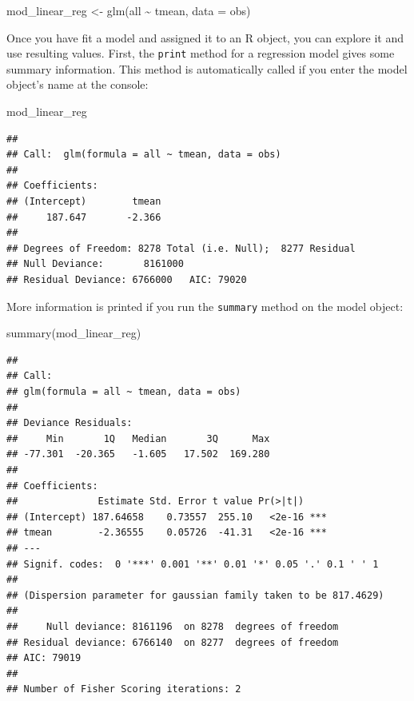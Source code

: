 \documentclass[
]{book}
\newenvironment{Shaded}{\begin{snugshade}}{\end{snugshade}}
\newcommand{\AttributeTok}[1]{\textcolor[rgb]{0.77,0.63,0.00}{#1}}
\newcommand{\FunctionTok}[1]{\textcolor[rgb]{0.00,0.00,0.00}{#1}}
\newcommand{\NormalTok}[1]{#1}
\newcommand{\OtherTok}[1]{\textcolor[rgb]{0.56,0.35,0.01}{#1}}
\newcommand{\SpecialCharTok}[1]{\textcolor[rgb]{0.00,0.00,0.00}{#1}}
\begin{document}
\begin{Shaded}
\begin{Highlighting}[]
\NormalTok{mod\_linear\_reg }\OtherTok{\textless{}{-}} \FunctionTok{glm}\NormalTok{(all }\SpecialCharTok{\textasciitilde{}}\NormalTok{ tmean, }\AttributeTok{data =}\NormalTok{ obs)}
\end{Highlighting}
\end{Shaded}

Once you have fit a model and assigned it to an R object, you can explore it
and use resulting values. First, the \texttt{print} method for a regression model
gives some summary information. This method is automatically called if you
enter the model object's name at the console:

\begin{Shaded}
\begin{Highlighting}[]
\NormalTok{mod\_linear\_reg}
\end{Highlighting}
\end{Shaded}

\begin{verbatim}
## 
## Call:  glm(formula = all ~ tmean, data = obs)
## 
## Coefficients:
## (Intercept)        tmean  
##     187.647       -2.366  
## 
## Degrees of Freedom: 8278 Total (i.e. Null);  8277 Residual
## Null Deviance:       8161000 
## Residual Deviance: 6766000   AIC: 79020
\end{verbatim}

More information is printed if you run the \texttt{summary} method on the model
object:

\begin{Shaded}
\begin{Highlighting}[]
\FunctionTok{summary}\NormalTok{(mod\_linear\_reg)}
\end{Highlighting}
\end{Shaded}

\begin{verbatim}
## 
## Call:
## glm(formula = all ~ tmean, data = obs)
## 
## Deviance Residuals: 
##     Min       1Q   Median       3Q      Max  
## -77.301  -20.365   -1.605   17.502  169.280  
## 
## Coefficients:
##              Estimate Std. Error t value Pr(>|t|)    
## (Intercept) 187.64658    0.73557  255.10   <2e-16 ***
## tmean        -2.36555    0.05726  -41.31   <2e-16 ***
## ---
## Signif. codes:  0 '***' 0.001 '**' 0.01 '*' 0.05 '.' 0.1 ' ' 1
## 
## (Dispersion parameter for gaussian family taken to be 817.4629)
## 
##     Null deviance: 8161196  on 8278  degrees of freedom
## Residual deviance: 6766140  on 8277  degrees of freedom
## AIC: 79019
## 
## Number of Fisher Scoring iterations: 2
\end{verbatim}
\end{document}
